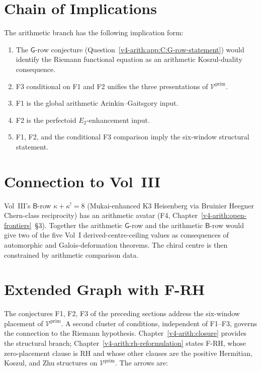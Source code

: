 \section{Chain of Implications}
\label{v4-arith:app:C:chain-of-implications}

The arithmetic branch has the following implication form:

\begin{enumerate}
\item The \(\mathsf{G}\)-row conjecture
(Question~\ref{v4-arith:app:C:G-row-statement}) would identify the Riemann
functional equation as an arithmetic Koszul-duality consequence.
\item F3 conditional on F1 and F2 unifies the three presentations of
\(\mathcal V^{\mathrm{prim}}\).
\item F1 is the global arithmetic Arinkin--Gaitsgory input.
\item F2 is the perfectoid \(E_{2}\)-enhancement input.
\item F1, F2, and the conditional F3 comparison imply the six-window
structural statement.
\end{enumerate}

\section{Connection to Vol~III}
\label{v4-arith:app:C:vol3-connection}

Vol~III's \(\mathsf{B}\)-row \(\kappa+\kappa^{!}=8\) (Mukai-enhanced K3
Heisenberg via Bruinier Heegner Chern-class reciprocity) has an
arithmetic avatar (F4, Chapter~\ref{v4-arith:open-frontiers}~\S3).
Together the arithmetic \(\mathsf{G}\)-row and the arithmetic
\(\mathsf{B}\)-row would give two of the five Vol~I
derived-centre-ceiling values as consequences of automorphic and
Galois-deformation theorems.  The chiral centre is then constrained by
arithmetic comparison data.

\section{Extended Graph with F-RH}
\label{v4-arith:app:C:extended-graph}

The conjectures F1, F2, F3 of the preceding sections address the
six-window placement of \(\mathcal{V}^{\mathrm{prim}}\). A second
cluster of conditions, independent of F1--F3, governs the
connection to the Riemann hypothesis. Chapter~\ref{v4-arith:closure}
provides the structural branch; Chapter~\ref{v4-arith:rh-reformulation}
states F-RH, whose zero-placement clause is RH and whose other clauses
are the positive Hermitian, Koszul, and Zhu structures on
\(\mathcal{V}^{\mathrm{prim}}\). The arrows are:

